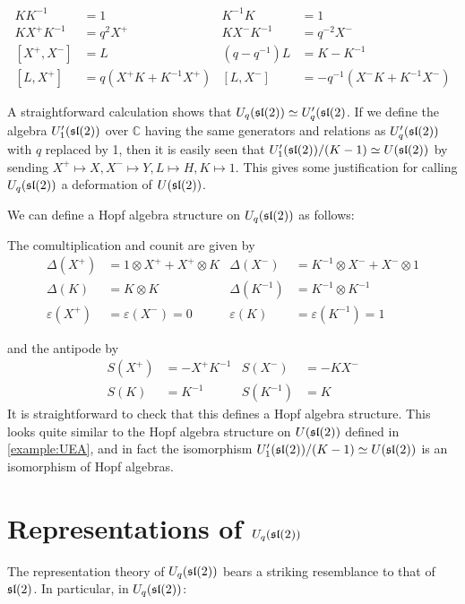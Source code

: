 \begin{align}
    KK^{-1} &= 1 &  K^{-1}K  &=1 \\
    KX^+K^{-1} &= q^2 X^+ & KX^-K^{-1} &= q^{-2} X^- \\
    [X^+,X^-] &= L  & (q - q^{-1})L &= K-K^{-1} \\
    [L,X^+] &= q(X^+K + K^{-1}X^+) & [L,X^-] &= -q^{-1}(X^-K + K^{-1}X^-)
\end{align}

A straightforward calculation shows that $U_q(\mathfrak{sl}(2)) \simeq U_q'(\mathfrak{sl}(2)$. If
we define the algebra $U_1'(\mathfrak{sl}(2))$ over $\mathbb{C}$ having the same
generators and relations as $U_q'(\mathfrak{sl}(2))$ with $q$ replaced by 1, then it is
easily seen that $U_1'(\mathfrak{sl}(2)) /(K-1) \simeq U(\mathfrak{sl}(2))$ by sending $X^+
\mapsto X, X^- \mapsto Y, L \mapsto H, K \mapsto 1$. This gives some
justification for calling $U_q(\mathfrak{sl}(2))$ a deformation of $U(\mathfrak{sl}(2))$.

We can define a Hopf algebra structure on $U_q(\mathfrak{sl}(2))$ as follows:

The comultiplication and counit are given by
\begin{align}
    \Delta(X^+) &= 1 \otimes  X^+  +  X^+  \otimes K &  \Delta(X^-) &= K^{-1} \otimes X^- + X^- \otimes 1 \\
    \Delta(K) &= K \otimes K &  \Delta(K^{-1}) &= K^{-1} \otimes K^{-1}\\ 
    \varepsilon( X^+ ) &= \varepsilon(X^-) = 0 &  \varepsilon(K) &= \varepsilon(K^{-1}) = 1
\end{align}

and the antipode by
\begin{align}
    S(X^+) &= - X^+ K^{-1} & S(X^-)      &= -KX^- \\
    S(K) &= K^{-1}   & S(K^{-1}) &= K 
\end{align}
It is straightforward to check that this defines a Hopf algebra structure. This
looks quite similar to the Hopf algebra structure on $U(\mathfrak{sl}(2))$ defined in
\ref{example:UEA}, and in fact the isomorphism $U_1'(\mathfrak{sl}(2)) /(K-1)
\simeq U(\mathfrak{sl}(2))$ is an isomorphism of Hopf algebras.

\section{Representations of $U_q(\mathfrak{sl}(2))$}
\label{section:RepsOfUq}

The representation theory of $U_q(\mathfrak{sl}(2))$ bears a striking resemblance to
that of $\mathfrak{sl}(2)$. In particular, in $U_q(\mathfrak{sl}(2))$:

